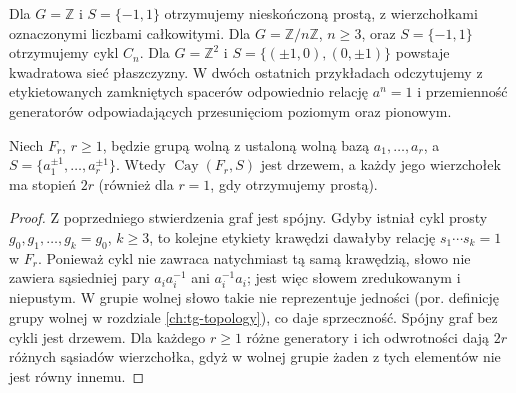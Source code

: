 \begin{przyklad}
Dla $G=\mathbb Z$ i $S=\{-1,1\}$ otrzymujemy
nieskończoną prostą, z wierzchołkami oznaczonymi liczbami całkowitymi.
Dla $G=\mathbb Z/n\mathbb Z$, $n\ge3$, oraz $S=\{-1,1\}$
otrzymujemy cykl $C_n$. Dla $G=\mathbb Z^2$ i
$S=\{(\pm1,0),(0,\pm1)\}$ powstaje kwadratowa sieć
płaszczyzny. W dwóch ostatnich przykładach odczytujemy
z etykietowanych zamkniętych spacerów odpowiednio relację $a^n=1$ i przemienność
generatorów odpowiadających przesunięciom poziomym
oraz pionowym.
\end{przyklad}

\begin{center}
\end{center}

\begin{twierdzenie}
Niech $F_r$, $r\ge1$, będzie grupą wolną
z ustaloną wolną bazą $a_1,\ldots,a_r$, a $S=\{a_1^{\pm1},\ldots,a_r^{\pm1}\}$.
Wtedy $\operatorname{Cay}(F_r,S)$ jest drzewem,
a każdy jego wierzchołek ma stopień $2r$
(również dla $r=1$, gdy otrzymujemy prostą).
\end{twierdzenie}
\begin{proof}
Z poprzedniego stwierdzenia graf jest spójny. Gdyby istniał
cykl prosty $g_0,g_1,\ldots,g_k=g_0$, $k\ge3$, to
kolejne etykiety krawędzi dawałyby relację
$s_1\cdots s_k=1$ w $F_r$. Ponieważ cykl nie zawraca
natychmiast tą samą krawędzią, słowo nie zawiera sąsiedniej
pary $a_i a_i^{-1}$ ani $a_i^{-1}a_i$; jest więc słowem
zredukowanym i niepustym. W grupie wolnej słowo takie
nie reprezentuje jedności (por. definicję grupy wolnej
w rozdziale \ref{ch:tg-topology}), co daje sprzeczność.
Spójny graf bez cykli jest drzewem. Dla każdego
$r\ge1$ różne generatory i ich odwrotności
dają $2r$ różnych sąsiadów wierzchołka,
gdyż w wolnej grupie żaden z tych elementów
nie jest równy innemu.
\end{proof}

